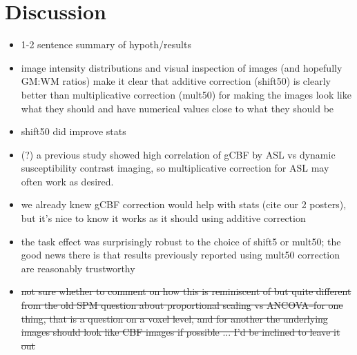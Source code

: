 \section{Discussion}

\begin{itemize}
\item 1-2 sentence summary of hypoth/results
\item image intensity distributions and visual inspection of images (and hopefully GM:WM ratios) make it clear that additive correction (shift50) is clearly better than multiplicative correction (mult50) for making the images look like what they should and have numerical values close to what they should be
\item shift50 did improve stats
\item (?) a previous study showed high correlation of gCBF by ASL vs dynamic susceptibility contrast imaging, so multiplicative correction for ASL may often work as desired.\cite{Knutsson_2010}
\item we already knew gCBF correction would help with stats (cite our 2 posters),\cite{22789842} but it's nice to know it works as it should using additive correction
\item the task effect was surprisingly robust to the choice of shift5 or mult50; the good news there is that results previously reported using  mult50 correction are reasonably trustworthy
\item \sout{not sure whether to comment on how this is reminiscent of but quite different from the old SPM question about proportional scaling vs ANCOVA--for one thing, that is a question on a voxel level, and for another the underlying images should look like CBF images if possible ... I'd be inclined to leave it out}
\end{itemize}

